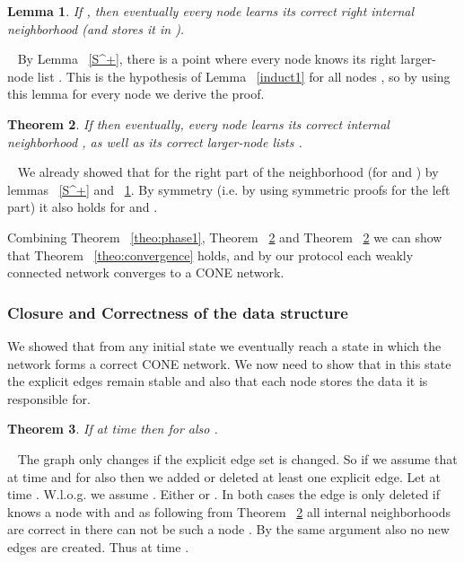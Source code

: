 \documentclass[11pt]{article}
\newtheorem{theorem}{Theorem}[section]
\newtheorem{lemma}[theorem]{Lemma}
\newcommand{\sq}{\hbox{\rlap{}}}
\newcommand{\qed}{\hspace*{\fill}\sq}
\newenvironment{proof}{\noindent {\bf Proof.}\ }{\qed\par\vskip 4mm\par}
\begin{document}
\begin{lemma}\label{S^-}
If , then eventually every node  learns its correct right internal neighborhood  (and stores it in ).
\end{lemma}

\begin{proof}
By Lemma ~\ref{S^+}, there is a point where every node knows its right larger-node list  .
This is the hypothesis of Lemma ~\ref{induct1} for all nodes , so by using this lemma for every node  we derive the proof.
\end{proof}

\begin{theorem}\label{theo:phase3}
If  then eventually, every node  learns its correct internal neighborhood  , as well as its correct larger-node lists .
\end{theorem}

\begin{proof}
We already showed that for the right part of the neighborhood (for  and ) by lemmas ~\ref{S^+} and ~\ref{S^-}.
By symmetry (i.e. by using symmetric proofs for the left part) it also holds for  and .
\end{proof}



Combining Theorem ~\ref{theo:phase1}, Theorem ~\ref{theo:phase3} and Theorem ~\ref{theo:phase3} we can show that Theorem ~\ref{theo:convergence} holds, and by our protocol each weakly connected network converges to a CONE network.

\subsubsection{Closure and Correctness of the data structure}

We showed that from any initial state we eventually reach a state in which the network forms a correct CONE network. We now need to show that in this state the explicit edges remain stable and also that each node stores the data it is responsible for.

\begin{theorem}\label{theo:closure}
If  at time  then for  also .
\end{theorem}

\begin{proof}
The graph  only changes if the explicit edge set is changed. So if we assume that  at time  and for  also  then we added or deleted at least one explicit edge. Let  at time . W.l.o.g. we assume . Either  or . In both cases the edge is only deleted if  knows a node  with  and  as following from Theorem ~\ref{theo:phase3} all internal neighborhoods are correct in  there can not be such a node . By the same argument also no new edges are created. Thus  at time .
\end{proof}
\end{document}
